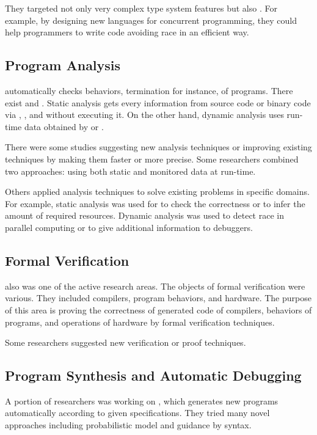 They targeted not only very complex type system features but also . For example, by designing new languages for concurrent
programming, they could help programmers to write code avoiding race in an efficient way.

\subsection{Program Analysis}

 automatically checks behaviors, termination for instance, of programs. There
exist  and . Static analysis gets every
information from source code or binary code via , , and  without executing it. On the other
hand, dynamic analysis uses run-time data obtained by  or .

There were some studies suggesting new analysis techniques or improving
existing techniques by making them faster or more precise. Some researchers
combined two approaches: using both static and monitored data at run-time.

Others applied analysis techniques to solve existing problems in specific
domains. For example, static analysis was used for  to
check the correctness or to infer the amount of required resources. Dynamic
analysis was used to detect race in parallel computing or to give additional
information to debuggers.

\subsection{Formal Verification}

 also was one of the active research areas. The objects of formal verification were
various. They included compilers, program behaviors, and hardware. The purpose
of this area is proving the correctness of generated code of compilers,
behaviors of programs, and operations of hardware by formal verification techniques.

Some researchers suggested new verification or proof techniques.

\subsection{Program Synthesis and Automatic Debugging}

A portion of researchers was working on , which generates
new programs automatically according to given specifications. They tried many
novel approaches including probabilistic model and guidance by syntax.
